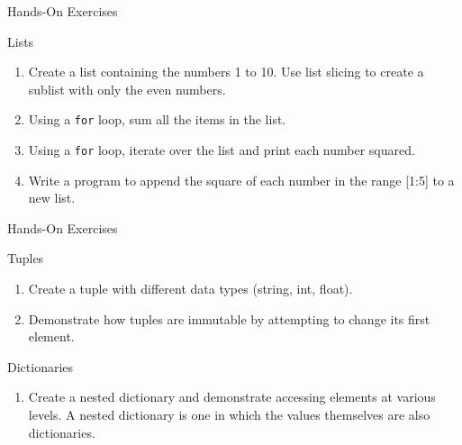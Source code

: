 \documentclass[ignorenonframetext,xcolor=x11names]{beamer}
\begin{document}
\begin{frame}{Hands-On Exercises}
\begin{block}{Lists}
\begin{enumerate}
    \item Create a list containing the numbers 1 to 10. Use list slicing to create a sublist with only the even numbers.
    \item Using a \texttt{for} loop, sum all the items in the list.
    \item Using a \texttt{for} loop, iterate over the list and print each number squared.
    \item Write a program to append the square of each number in the range [1:5] to a new list.
\end{enumerate}
\end{block}
\end{frame}
\begin{frame}{Hands-On Exercises}
\begin{block}{Tuples}
\begin{enumerate}
    \item Create a tuple with different data types (string, int, float).
    \item Demonstrate how tuples are immutable by attempting to change its first element.
\end{enumerate}
\end{block}

\begin{block}{Dictionaries}
\begin{enumerate}
    \item Create a nested dictionary and demonstrate accessing elements at various levels. A nested dictionary is one in which the values themselves are also dictionaries.
\end{enumerate}
\end{block}
\end{frame}
\end{document}
